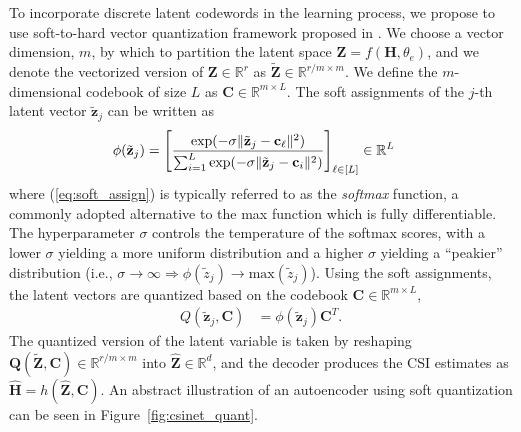 To incorporate discrete latent codewords in the learning process, we propose to use soft-to-hard vector quantization framework proposed in \cite{ref:Agustsson2017SoftToHard}. We choose a vector dimension, $m$, by which to partition the latent space $\mathbf Z = f(\mathbf H, \theta_e)$, and we denote the vectorized version of $\mathbf Z \in \mathbb R^{r}$ as $\tilde{\mathbf Z} \in \mathbb R^{r/m \times m}$. We define the $m$-dimensional codebook of size $L$ as $\mathbf C \in \mathbb R^{m\times L}$. The soft assignments of the $j$-th latent vector $\tilde{\mathbf z}_j$ can be written as
\begin{align}
\phi(\tilde{\mathbf z}_j) &= \left[\frac{\text{exp}(-\sigma \Arrowvert \tilde{\mathbf z}_j - \mathbf c_\ell\Arrowvert^2)}{\sum_{i=1}^L\text{exp}(-\sigma \Arrowvert \tilde{\mathbf z}_j - \mathbf c_i\Arrowvert^2)}\right]_{\ell\in [L]} \in \mathbb R^L \label{eq:soft_assign}
\end{align}
where (\ref{eq:soft_assign}) is typically referred to as the \emph{softmax} function, a commonly adopted alternative to the max function which is fully differentiable. The hyperparameter $\sigma$ controls the temperature of the softmax scores, with a lower $\sigma$ yielding a more uniform distribution and a higher $\sigma$ yielding a ``peakier'' distribution (i.e., $\sigma \to \infty \Rightarrow \phi(\tilde z_j) \to \text{max}(\tilde z_j)$). Using the soft assignments, the latent vectors are quantized based on the codebook $\mathbf C \in \mathbb R^{m \times L}$,
\begin{align}
Q(\tilde{\mathbf z}_j,\mathbf C) &= \phi(\tilde{\mathbf z}_j) \mathbf C^T. \label{eq:soft_quant}
\end{align}
The quantized version of the latent variable is taken by reshaping $\mathbf Q(\tilde{\mathbf Z},\mathbf C) \in \mathbb R^{r/m \times m}$ into $\hat{\mathbf Z} \in \mathbb R^d$, and the decoder produces the CSI estimates as $\hat{\mathbf H} = h(\hat{\mathbf Z}, \mathbf C)$. An abstract illustration of an autoencoder using soft quantization can be seen in Figure~\ref{fig:csinet_quant}.


